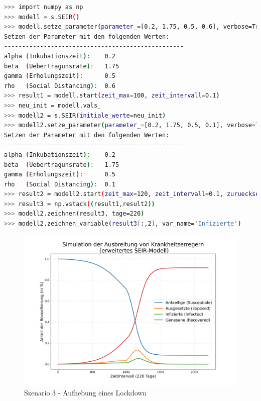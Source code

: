 \documentclass[12pt]{article}
\begin{document}
\begin{lstlisting}[language=Bash, caption=Szenario 3 - Aufhebung eines Lockdown, label=lst:Szenario3]
>>> import numpy as np
>>> modell = s.SEIR()
>>> modell.setze_parameter(parameter_=[0.2, 1.75, 0.5, 0.6], verbose=True)
Setzen der Parameter mit den folgenden Werten:
--------------------------------------------------
alpha (Inkubationszeit):    0.2
beta  (Uebertragunsrate):   1.75
gamma (Erholungszeit):      0.5
rho   (Social Distancing):  0.6
>>> result1 = modell.start(zeit_max=100, zeit_intervall=0.1)
>>> neu_init = modell.vals_
>>> modell2 = s.SEIR(initiale_werte=neu_init)
>>> modell2.setze_parameter(parameter_=[0.2, 1.75, 0.5, 0.1], verbose=True)
Setzen der Parameter mit den folgenden Werten:
--------------------------------------------------
alpha (Inkubationszeit):    0.2
beta  (Uebertragunsrate):   1.75
gamma (Erholungszeit):      0.5
rho   (Social Distancing):  0.1
>>> result2 = modell2.start(zeit_max=120, zeit_intervall=0.1, zuruecksetzen=False)
>>> result3 = np.vstack((result1,result2))
>>> modell2.zeichnen(result3, tage=220)
>>> modell2.zeichnen_variable(result3[:,2], var_name='Infizierte')
\end{lstlisting}

\begin{figure}[H]
\centering
\includegraphics[scale=0.4]{Szenario_3}
\caption{Szenario 3 - Aufhebung eines Lockdown}
\label{fig:szenario_3}
\end{figure}
\end{document}
